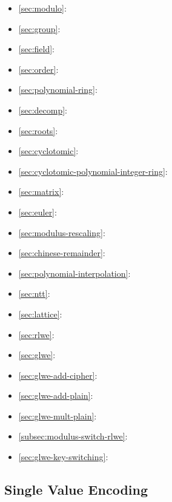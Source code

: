 \begin{itemize}
\item \autoref{sec:modulo}: 
\item \autoref{sec:group}: 
\item \autoref{sec:field}: 
\item \autoref{sec:order}: 
\item \autoref{sec:polynomial-ring}: 
\item \autoref{sec:decomp}: 
\item \autoref{sec:roots}: 
\item \autoref{sec:cyclotomic}: 
\item \autoref{sec:cyclotomic-polynomial-integer-ring}: 
\item \autoref{sec:matrix}: 
\item \autoref{sec:euler}: 
\item \autoref{sec:modulus-rescaling}: 
\item \autoref{sec:chinese-remainder}: 
\item \autoref{sec:polynomial-interpolation}: 
\item \autoref{sec:ntt}: 
\item \autoref{sec:lattice}: 
\item \autoref{sec:rlwe}: 
\item \autoref{sec:glwe}: 
\item \autoref{sec:glwe-add-cipher}: 
\item \autoref{sec:glwe-add-plain}: 
\item \autoref{sec:glwe-mult-plain}: 
\item \autoref{subsec:modulus-switch-rlwe}: 
\item \autoref{sec:glwe-key-switching}: 
\end{itemize}


\subsection{Single Value Encoding}
\label{subsec:bfv-single-encoding}

